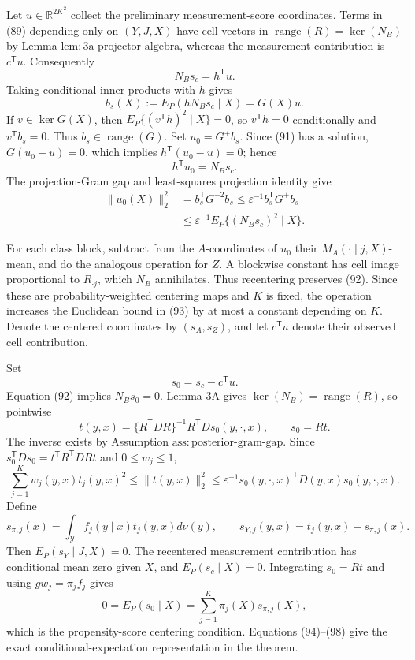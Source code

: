 Let \(u\in\mathbb R^{2K^2}\) collect the preliminary measurement-score coordinates.  Terms in (89) depending only on \((Y,J,X)\) have cell vectors in
\(\operatorname{range}(R)=\ker(N_B)\) by Lemma \(\mathrm{lem{:}3a\mbox{-}projector\mbox{-}algebra}\), whereas the measurement contribution is \(c^{\mathsf T}u\).  Consequently
\[
 N_Bs_c=h^{\mathsf T}u. \tag{90}
\]
Taking conditional inner products with \(h\) gives
\[
 b_s(X):=E_P(hN_Bs_c\mid X)=G(X)u. \tag{91}
\]
If \(v\in\ker G(X)\), then \(E_P\{(v^{\mathsf T}h)^2\mid X\}=0\), so \(v^{\mathsf T}h=0\) conditionally and \(v^{\mathsf T}b_s=0\).  Thus \(b_s\in\operatorname{range}(G)\).  Set \(u_0=G^+b_s\).  Since (91) has a solution, \(G(u_0-u)=0\), which implies \(h^{\mathsf T}(u_0-u)=0\); hence
\[
 h^{\mathsf T}u_0=N_Bs_c. \tag{92}
\]
The projection-Gram gap and least-squares projection identity give
\[
\begin{aligned}
 \|u_0(X)\|_2^2
 &=b_s^{\mathsf T}G^{+2}b_s
 \leq\varepsilon^{-1}b_s^{\mathsf T}G^+b_s\\
 &\leq\varepsilon^{-1}E_P\{(N_Bs_c)^2\mid X\}. \tag{93}
\end{aligned}
\]

For each class block, subtract from the \(A\)-coordinates of \(u_0\) their \(M_A(\cdot\mid j,X)\)-mean, and do the analogous operation for \(Z\).  A blockwise constant has cell image proportional to \(R_{\cdot j}\), which \(N_B\) annihilates.  Thus recentering preserves (92).  Since these are probability-weighted centering maps and \(K\) is fixed, the operation increases the Euclidean bound in (93) by at most a constant depending on \(K\).  Denote the centered coordinates by \((s_A,s_Z)\), and let \(c^{\mathsf T}u\) denote their observed cell contribution.

Set
\[
 s_0=s_c-c^{\mathsf T}u. \tag{94}
\]
Equation (92) implies \(N_Bs_0=0\).  Lemma 3A gives
\(\ker(N_B)=\operatorname{range}(R)\), so pointwise
\[
 t(y,x)=\{R^{\mathsf T}DR\}^{-1}R^{\mathsf T}D
 s_0(y,\cdot,x),\qquad s_0=Rt. \tag{95}
\]
The inverse exists by Assumption \(\mathrm{ass{:}posterior\mbox{-}gram\mbox{-}gap}\).  Since
\(s_0^{\mathsf T}Ds_0=t^{\mathsf T}R^{\mathsf T}DRt\) and \(0\leq w_j\leq1\),
\[
 \sum_{j=1}^Kw_j(y,x)t_j(y,x)^2
 \leq\|t(y,x)\|_2^2
 \leq\varepsilon^{-1}s_0(y,\cdot,x)^{\mathsf T}D(y,x)s_0(y,\cdot,x). \tag{96}
\]
Define
\[
 s_{\pi,j}(x)=\int_{\mathcal Y}f_j(y\mid x)t_j(y,x)d\nu(y),
 \qquad
 s_{Y,j}(y,x)=t_j(y,x)-s_{\pi,j}(x). \tag{97}
\]
Then \(E_P(s_Y\mid J,X)=0\).  The recentered measurement contribution has conditional mean zero given \(X\), and \(E_P(s_c\mid X)=0\).  Integrating \(s_0=Rt\) and using \(gw_j=\pi_jf_j\) gives
\[
 0=E_P(s_0\mid X)=\sum_{j=1}^K\pi_j(X)s_{\pi,j}(X), \tag{98}
\]
which is the propensity-score centering condition.  Equations (94)--(98) give the exact conditional-expectation representation in the theorem.


